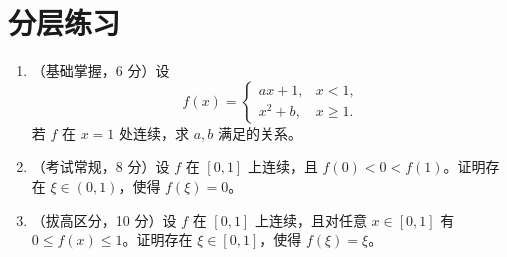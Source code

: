 \section{分层练习}

\begin{enumerate}
  \item[1.]（基础掌握，6 分）设
  \[
    f(x)=
    \begin{cases}
      ax+1, & x<1,\\
      x^2+b, & x\ge 1.
    \end{cases}
  \]
  若 $f$ 在 $x=1$ 处连续，求 $a,b$ 满足的关系。

  \item[2.]（考试常规，8 分）设 $f$ 在 $[0,1]$ 上连续，且 $f(0)<0<f(1)$。证明存在 $\xi\in(0,1)$，使得 $f(\xi)=0$。

  \item[3.]（拔高区分，10 分）设 $f$ 在 $[0,1]$ 上连续，且对任意 $x\in[0,1]$ 有 $0\le f(x)\le 1$。证明存在 $\xi\in[0,1]$，使得 $f(\xi)=\xi$。
\end{enumerate}
